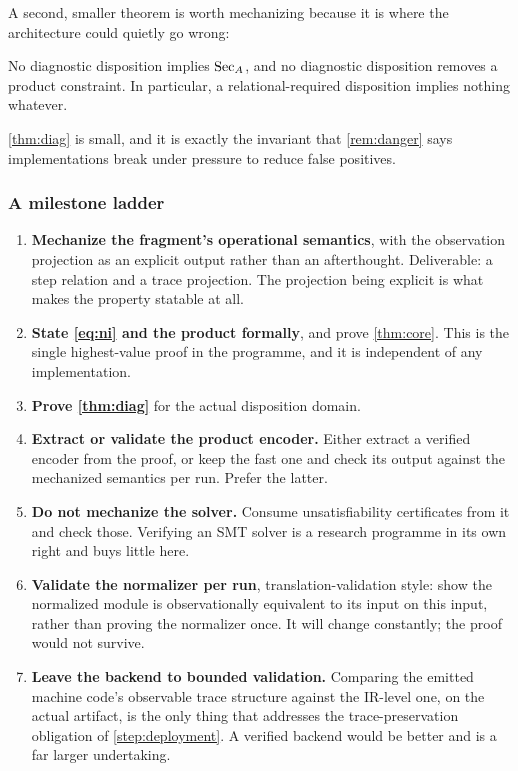 A second, smaller theorem is worth mechanizing because it is where the
architecture could quietly go wrong:

\begin{theorem}
\label{thm:diag}
No diagnostic disposition implies $\mathrm{Sec}_A$, and no diagnostic disposition
removes a product constraint. In particular, a relational-required disposition
implies nothing whatever.
\end{theorem}

\cref{thm:diag} is small, and it is exactly the invariant that
\cref{rem:danger} says implementations break under pressure to reduce false
positives.

\subsubsection*{A milestone ladder}

\begin{enumerate}[leftmargin=1.8em]
\item \textbf{Mechanize the fragment's operational semantics}, with the
      observation projection as an explicit output rather than an afterthought.
      Deliverable: a step relation and a trace projection. The projection being
      explicit is what makes the property statable at all.
\item \textbf{State \eqref{eq:ni} and the product formally}, and prove
      \cref{thm:core}. This is the single highest-value proof in the programme,
      and it is independent of any implementation.
\item \textbf{Prove \cref{thm:diag}} for the actual disposition domain.
\item \textbf{Extract or validate the product encoder.} Either extract a verified
      encoder from the proof, or keep the fast one and check its output against
      the mechanized semantics per run. Prefer the latter.
\item \textbf{Do not mechanize the solver.} Consume unsatisfiability certificates
      from it and check those. Verifying an SMT solver is a research programme in
      its own right and buys little here.
\item \textbf{Validate the normalizer per run}, translation-validation style:
      show the normalized module is observationally equivalent to its input on
      this input, rather than proving the normalizer once. It will change
      constantly; the proof would not survive.
\item \textbf{Leave the backend to bounded validation.} Comparing the emitted
      machine code's observable trace structure against the IR-level one, on the
      actual artifact, is the only thing that addresses the
      trace-preservation obligation of \cref{step:deployment}. A verified backend
      would be better and is a far larger undertaking.
\end{enumerate}

